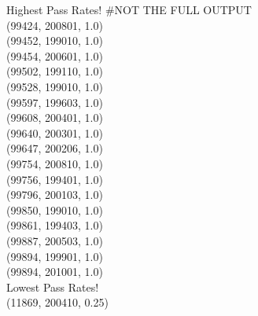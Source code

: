 Highest Pass Rates! #NOT THE FULL OUTPUT \\
(99424, 200801, 1.0) \\
(99452, 199010, 1.0) \\
(99454, 200601, 1.0) \\
(99502, 199110, 1.0) \\
(99528, 199010, 1.0) \\
(99597, 199603, 1.0) \\
(99608, 200401, 1.0) \\
(99640, 200301, 1.0) \\
(99647, 200206, 1.0) \\
(99754, 200810, 1.0) \\
(99756, 199401, 1.0) \\
(99796, 200103, 1.0) \\
(99850, 199010, 1.0) \\
(99861, 199403, 1.0) \\
(99887, 200503, 1.0) \\
(99894, 199901, 1.0) \\
(99894, 201001, 1.0) \\
Lowest Pass Rates! \\
(11869, 200410, 0.25) \\
